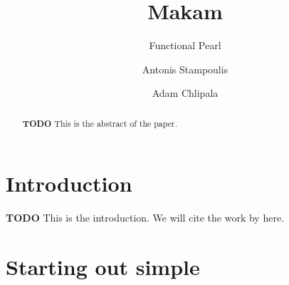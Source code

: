 \documentclass[format=acmlarge,review,anonymous]{acmart}\settopmatter{printfolios=true}
\begin{document}
\title{Makam}
\subtitle{Functional Pearl}

\author{Antonis Stampoulis}

\author{Adam Chlipala}

\newcommand\TODO[0]{\textbf{TODO}}
\newcommand\lamprolog[0]{$\lambda$Prolog\xspace}

\begin{abstract}
\TODO{} This is the abstract of the paper.
\end{abstract}



\maketitle



\section{Introduction}

\TODO{} This is the introduction. We will cite the work by \citet{miller1988overview} here.


\section{Starting out simple}
\end{document}
